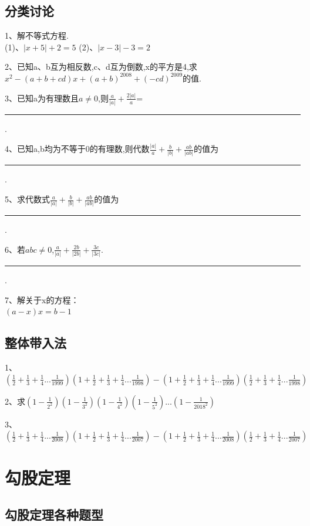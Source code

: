 \documentclass[14pt,UTF-8,a4paper,titlepage]{ctexbook}
\begin{document}
\section{分类讨论}
1、解不等式方程.\\
\qquad \qquad (1)、$|x+5|+2=5$ \qquad\qquad\qquad\qquad\qquad\qquad (2)、$|x-3|-3=2$\par
\vspace{3cm}
2、已知a、b互为相反数,c、d互为倒数,x的平方是4,求$x^2-(a+b+cd)x+(a+b)^{2008}+(-cd)^{2009}$的值.\par
\vspace{3cm}
3、已知a为有理数且$a \neq 0 $,则$\frac{a}{|a|}+\frac{2|a|}{a}$= \rule[-5pt]{1.3cm}{0.05em}.\par
4、已知a,b均为不等于0的有理数,则代数$\frac{|a|}{a}+\frac{b}{|b|}+\frac{ab}{|ab|} $的值为\rule[-5pt]{1.3cm}{0.05em}.\par
5、求代数式$\frac{a}{|a|}+\frac{b}{|b|}+\frac{ab}{|ab|} $的值为 \rule[-5pt]{1.3cm}{0.05em}.\par
6、若$abc\neq 0 $,$\frac{a}{|a|}+\frac{2b}{|2b|}+\frac{3c}{|3c|} $.\rule[-5pt]{1.3cm}{0.05em}.\par
7、解关于x的方程：\\
$(a-x)x=b-1$\\
\vspace{3cm}
\section{整体带入法}
1、$(\frac{1}{2}+\frac{1}{3}+\frac{1}{4}...\frac{1}{1999})(1+\frac{1}{2}+\frac{1}{3}+\frac{1}{4}...\frac{1}{1998})-(1+\frac{1}{2}+\frac{1}{3}+\frac{1}{4}...\frac{1}{1999})(\frac{1}{2}+\frac{1}{3}+\frac{1}{4}...\frac{1}{1998})$\par
\vspace{2cm}
2、求$(1-\frac{1}{2^2} )(1-\frac{1}{3^2} )(1-\frac{1}{4^2} )(1-\frac{1}{5^2} )...(1-\frac{1}{2018^2} )$\par
\vspace{2cm}
3、$(\frac{1}{2}+\frac{1}{3}+\frac{1}{4}...\frac{1}{2008})(1+\frac{1}{2}+\frac{1}{3}+\frac{1}{4}...\frac{1}{2007})-(1+\frac{1}{2}+\frac{1}{3}+\frac{1}{4}...\frac{1}{2008})(\frac{1}{2}+\frac{1}{3}+\frac{1}{4}...\frac{1}{2007})$\\
\chapter{勾股定理}
\section{勾股定理各种题型}
\end{document}
